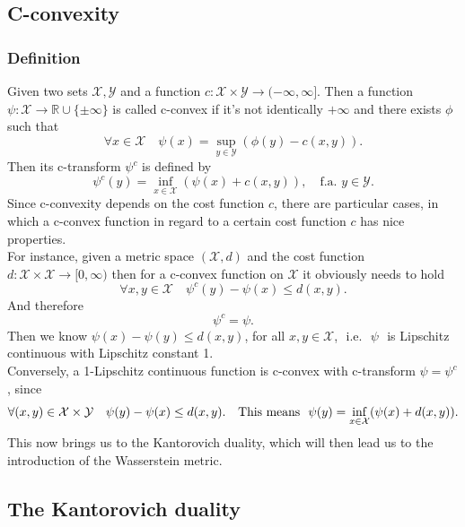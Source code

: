 \documentclass[11pt,a4paper]{article}
\begin{document}
\subsection{C-convexity}
\subsubsection{Definition}
Given two sets $\mathcal{X},\mathcal{Y}$ and a function $c:\mathcal{X}\times\mathcal{Y}\rightarrow{}(-\infty,\infty]$. Then a function $\psi:\mathcal{X}\rightarrow{}\mathbb{R}\cup\{\pm\infty\}$ is called c-convex if it's not identically $+\infty$ and there exists $\phi$ such that  
\[
\forall x\in\mathcal{X}\quad \psi(x)=\sup_{y\in\mathcal{Y}}\left(\phi(y)-c(x,y)\right).
\]
Then its c-transform $\psi^c$ is defined by 
\[
\psi^c(y)=\inf_{x\in\mathcal{X}}\left(\psi(x)+c(x,y)\right),\quad \text{f.a. }y\in\mathcal{Y}.
\]
Since c-convexity depends on the cost function $c$, there are particular cases, in which a c-convex function in regard to a certain cost function $c$ has nice properties.\\
For instance, given a metric space $(\mathcal{X},d)$ and the cost function $d:\mathcal{X\times{}X}\rightarrow{}[0,\infty)$ then for a c-convex function on $\mathcal{X}$ it obviously needs to hold
\[
\forall x,y\in\mathcal{X}\quad\psi^c(y)-\psi(x)\leq{}d(x,y).
\] 
And therefore 
\[
\psi^c=\psi. 
\]
Then we know $\psi(x)-\psi(y)\leq{}d(x,y)$, for all $x,y\in\mathcal{X}$,\,\, i.e.\,\, $\psi$\,\, is Lipschitz continuous with Lipschitz constant 1.\vspace{1em}\\
Conversely, a 1-Lipschitz continuous function is c-convex with c-transform $\psi=\psi^c$, since
\[
\forall (x,y)\in\mathcal{X\times{}Y}\quad \psi(y)-\psi(x)\leq{}d(x,y). \quad\text{This means }\,\,\psi(y)=\inf\limits_{x\in\mathcal{X}}(\psi(x)+d(x,y)).
\vspace{1em}\\
\]
This now brings us to the Kantorovich duality, which will then lead us to the introduction of the Wasserstein metric.
\subsection{The Kantorovich duality}
\end{document}
